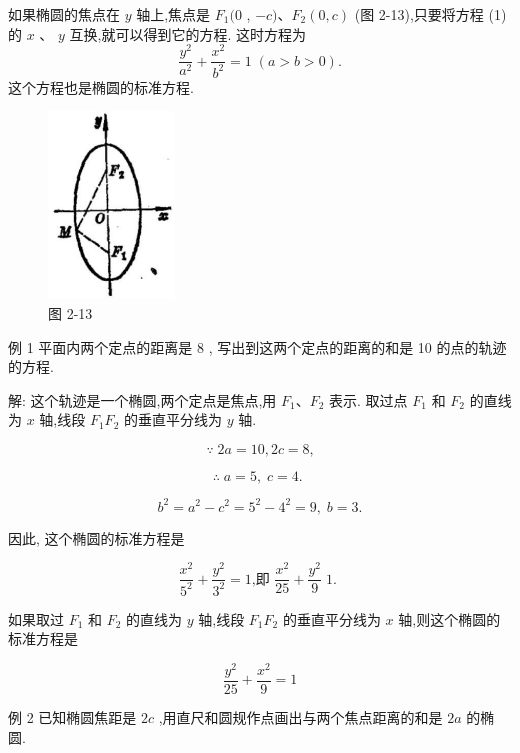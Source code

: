 \documentclass[lang=cn,newtx,10pt,scheme=chinese]{elegantbook}
\begin{document}
\begin{corollary}[椭圆的标准方程2]
	

如果椭圆的焦点在 \(y\) 轴上,焦点是 \({F}_{1}(0\) , \(- c)\text{、}{F}_{2}\left( {0,c}\right)\) (图 2-13),只要将方程 (1) 的 \(x\) 、 \(y\) 互换,就可以得到它的方程. 这时方程为
\[
  \frac{{y}^{2}}{{a}^{2}} + \frac{{x}^{2}}{{b}^{2}} = 1\;\left( {a > b > 0}\right) .
\]
这个方程也是椭圆的标准方程.

\end{corollary}

\begin{figure}[h]
  \centering
  \includegraphics[max width=0.3\textwidth]{images/01912cc2-ffb6-728e-9ae7-b113ff05c64b_88_686468.jpg}
  \caption{图 2-13}
\end{figure}




例 1 平面内两个定点的距离是 8 , 写出到这两个定点的距离的和是 10 的点的轨迹的方程.

解: 这个轨迹是一个椭圆,两个定点是焦点,用 \({F}_{1}\text{、}{F}_{2}\) 表示. 取过点 \({F}_{1}\) 和 \({F}_{2}\) 的直线为 \(x\) 轴,线段 \({F}_{1}{F}_{2}\) 的垂直平分线为 \(y\) 轴.

\[
  \because \;{2a} = {10},{2c} = 8\text{,}
\]

\[
  \therefore \;a = 5,\;c = 4\text{. }
\]

\[
    {b}^{2} = {a}^{2} - {c}^{2} = {5}^{2} - {4}^{2} = 9,\;b = 3.
\]

因此, 这个椭圆的标准方程是

\[
  \frac{{x}^{2}}{{5}^{2}} + \frac{{y}^{2}}{{3}^{2}} = 1\text{,即 }\frac{{x}^{2}}{25} + \frac{{y}^{2}}{9}\;1\text{. }
\]

如果取过 \({F}_{1}\) 和 \({F}_{2}\) 的直线为 \(y\) 轴,线段 \({F}_{1}{F}_{2}\) 的垂直平分线为 \(x\) 轴,则这个椭圆的标准方程是

\[
  \frac{{y}^{2}}{25} + \frac{{x}^{2}}{9} = 1
\]

例 2 已知椭圆焦距是 \({2c}\) ,用直尺和圆规作点画出与两个焦点距离的和是 \({2a}\) 的椭圆.
\end{document}
